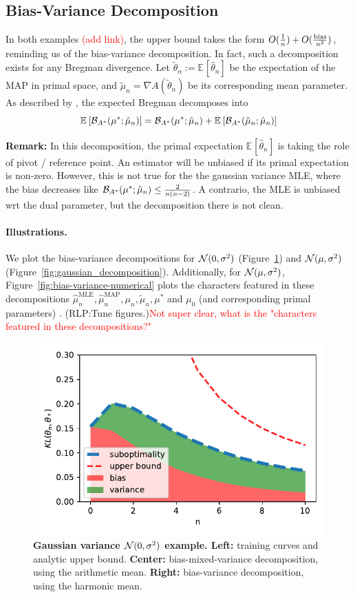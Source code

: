 \documentclass[twoside]{article}
\newcommand{\rlp}[1]{\textcolor{BrickRed}{(RLP:#1)}}
\newcommand*{\expect}[2][]{\ensuremath{\mathbb{E}_{#1} \left[ #2 \right] }} %
\newcommand*{\expecti}[2][]{\ensuremath{\mathbb{E}_{#1} [ #2 ] }} %
\newcommand{\logpart}{A}
\newcommand{\bregmanconj}{\cB_{\logpart^*}}
\newcommand{\m}{\mu}
\newcommand{\MAPm}{\hat \m_n}
\begin{document}
\subsection{Bias-Variance Decomposition} 
In both examples \textcolor{red}{(add link)}, the upper bound takes the form $O(\frac{1}{n}) + O(\frac{\text{bias}}{n^2})$, reminding us of the bias-variance decomposition. In fact, such a decomposition exists for any Bregman divergence.
Let $\tilde \theta_n := \expecti{\hat \theta_n}$ be the expectation of the MAP in primal space, and $\tilde \m_n = \nabla \logpart(\tilde \theta_n )$ be its corresponding mean parameter.
As described by \citet[Theorem 0.1]{pfau2013generalized}, the  expected Bregman decomposes into
\begin{equation}
	\expect{\bregmanconj(\m^* ; \hat \m_n)} = {\bregmanconj(\m^* ; \tilde \m_n)}
	+ {\expect{\bregmanconj(\tilde \m_n ; \MAPm)}}
	\label{eq:primal_pivot}
\end{equation}

\textbf{Remark:} In this decomposition, the primal expectation $\expect{\hat \theta_n}$ is taking the role of pivot / reference point. An estimator will be unbiased if its primal expectation is non-zero.
However, this is not true for the the gaussian variance MLE, where the bias decreases like ${\bregmanconj(\m^* ; \tilde \m_n)} \leq \frac{2}{n(n-2)}$.
A contrario, the MLE is unbiased wrt the dual parameter, but the decomposition there is not clean.

\paragraph{Illustrations.}
We plot the bias-variance decompositions for ${\mathcal N}(0,\sigma^2)$ (Figure~\ref{fig:variance_decomposition}) and  ${\mathcal N}(\mu, \sigma^2)$ (Figure~\ref{fig:gaussian_decomposition}).
Additionally,  for ${\mathcal N}(\mu, \sigma^2)$, Figure~\ref{fig:bias-variance-numerical} plots the characters featured in these decompositions $\hat \m_n^\text{MLE},\hat \m_n^\text{MAP},\m_n,\tilde \m_n, \m^*$ and $\m_0$ (and corresponding primal parameters) . \rlp{Tune figures.}\textcolor{red}{Not super clear, what is the "characters featured in these decompositions?"}


\begin{figure}[t]
	\centering
	\includegraphics[width=.4\textwidth]{figs/gaussian_variance.pdf}
	\caption{
	\textbf{Gaussian variance ${\mathcal N}(0,\sigma^2)$ example. Left:} training curves and analytic upper bound.
	\textbf{Center:} bias-mixed-variance decomposition, using the arithmetic mean.
	\textbf{Right:} bias-variance decomposition, using the harmonic mean.
	}
	\label{fig:variance_decomposition}
\end{figure}
\end{document}
